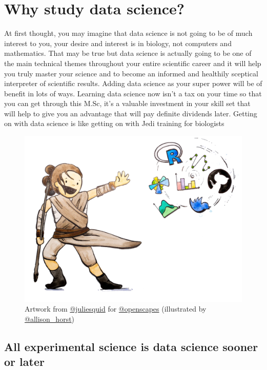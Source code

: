 \documentclass[
]{book}
\begin{document}
\hypertarget{intro}{%
\chapter{Why study data science?}\label{intro}}

At first thought, you may imagine that data science is not going to be of much interest to you, your desire and interest is in biology, not computers and mathematics. That may be true but data science is actually going to be one of the main technical themes throughout your entire scientific career and it will help you truly master your science and to become an informed and healthily sceptical interpreter of scientific results. Adding data science as your super power will be of benefit in lots of ways. Learning data science now isn't a tax on your time so that you can get through this M.Sc, it's a valuable investment in your skill set that will help to give you an advantage that will pay definite dividends later. Getting on with data science is like getting on with Jedi training for biologists

\begin{figure}
\centering
\includegraphics{starwars-rey-rstats.png}
\caption{\label{fig:unnamed-chunk-2}Artwork from \href{https://twitter.com/juliesquid}{@juliesquid} for \href{https://twitter.com/openscapes}{@openscapes} (illustrated by \href{https://twitter.com/allison_horst}{@allison\_horst})}
\end{figure}

\hypertarget{all-experimental-science-is-data-science-sooner-or-later}{%
\section{All experimental science is data science sooner or later}\label{all-experimental-science-is-data-science-sooner-or-later}}
\end{document}
